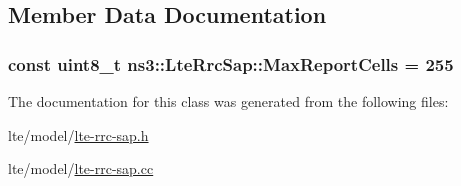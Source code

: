 \subsection{Member Data Documentation}
\subsubsection[{\texorpdfstring{Max\+Report\+Cells}{MaxReportCells}}]{\setlength{\rightskip}{0pt plus 5cm}const uint8\+\_\+t ns3\+::\+Lte\+Rrc\+Sap\+::\+Max\+Report\+Cells = 255\hspace{0.3cm}{\ttfamily [static]}}\hypertarget{classns3_1_1LteRrcSap_a27fc843a140e11173bb8e2ac2b282126}{}\label{classns3_1_1LteRrcSap_a27fc843a140e11173bb8e2ac2b282126}


The documentation for this class was generated from the following files\+:\begin{DoxyCompactItemize}
\item 
lte/model/\hyperlink{lte-rrc-sap_8h}{lte-\/rrc-\/sap.\+h}\item 
lte/model/\hyperlink{lte-rrc-sap_8cc}{lte-\/rrc-\/sap.\+cc}\end{DoxyCompactItemize}
